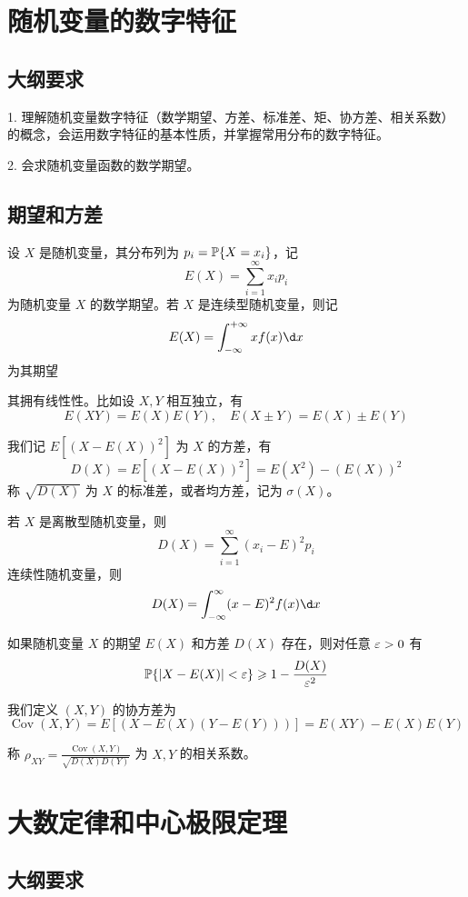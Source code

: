 \section{随机变量的数字特征}

\subsection{大纲要求}

1. 理解随机变量数字特征（数学期望、方差、标准差、矩、协方差、相关系数）的概念，会运用数字特征的基本性质，并掌握常用分布的数字特征。

2. 会求随机变量函数的数学期望。

\subsection{期望和方差}

设 $X$ 是随机变量，其分布列为 $p_i = \mathbb{P}\{X = x_i\}$，记
\[ E(X) = \sum_{i=1}^\infty x_i p_i \]
为随机变量 $X$ 的数学期望。若 $X$ 是连续型随机变量，则记
\[ E(X) = \int_{-\infty}^{+\infty} x f(x) \d x \]
为其期望

其拥有线性性。比如设 $X, Y$ 相互独立，有
\[ E(X Y) = E(X) E(Y), \quad E(X \pm Y) = E(X) \pm E(Y) \]

我们记 $E[(X - E(X))^2]$ 为 $X$ 的方差，有
\[ D(X) = E[(X - E(X))^2] = E(X^2) - (E(X))^2 \]
称 $\sqrt{D(X)}$ 为 $X$ 的标准差，或者均方差，记为 $\sigma(X)$。

若 $X$ 是离散型随机变量，则
\[ D(X) = \sum_{i=1}^{\infty} (x_i - E)^2 p_i \]
连续性随机变量，则
\[ D(X) = \int_{-\infty}^{\infty} (x-E)^2 f(x) \d x \]

\begin{theorem}[切比雪夫不等式]
	如果随机变量 $X$ 的期望 $E(X)$ 和方差 $D(X)$ 存在，则对任意 $\varepsilon > 0$ 有
	\[ \mathbb{P}\{|X - E(X)| < \varepsilon\} \geqslant 1 - \frac{D(X)}{\varepsilon^2} \]
\end{theorem}

我们定义 $(X, Y)$ 的协方差为
\[ \operatorname{Cov}(X, Y) = E[(X - E(X)(Y - E(Y)))] = E(XY) - E(X) E(Y) \]

称 $\rho_{XY} = \frac{\operatorname{Cov}(X, Y)}{\sqrt{D(X) D(Y)}}$ 为 $X, Y$ 的相关系数。



\section{大数定律和中心极限定理}

\subsection{大纲要求}

